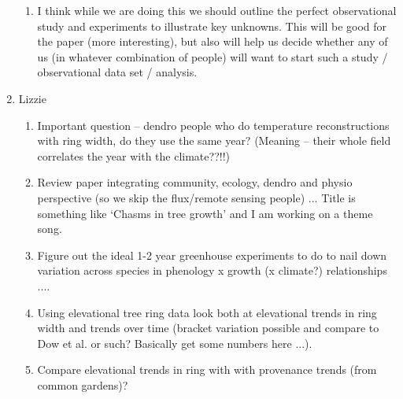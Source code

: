 \documentclass[11pt,letter]{article}
\begin{document}
\begin{enumerate}
\begin{enumerate}
\item I think while we are doing this we should outline the perfect observational study and experiments to illustrate key unknowns. This will be good for the paper (more interesting), but also will help us decide whether any of us (in whatever combination of people) will want to start such a study / observational data set / analysis.    
\end{enumerate}
\item Lizzie
\begin{enumerate}
\item Important question -- dendro people who do temperature reconstructions with ring width, do they use the same year? (Meaning -- their whole field correlates the year with the climate??!!)
\item Review paper integrating community, ecology, dendro and physio perspective (so we skip the flux/remote sensing people) ... Title is something like `Chasms in tree growth' and I am working on a theme song.
\item Figure out the ideal 1-2 year greenhouse experiments to do to nail down variation across species in phenology x growth (x climate?) relationships ....
\item Using elevational tree ring data look both at elevational trends in ring width and trends over time (bracket variation possible and compare to Dow et al. or such? Basically get some numbers here ...).
\item Compare elevational trends in ring with with provenance trends (from common gardens)?
\end{enumerate}
\end{enumerate}
\end{document}
